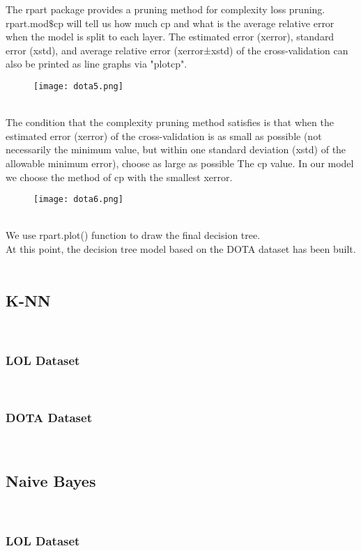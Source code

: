\documentclass[a4paper,fleqn]{cas-sc}
\begin{document}
The rpart package provides a pruning method for complexity loss pruning. rpart.mod$\$ $cp will tell us how much cp and what is the average relative error when the model is split to each layer.  The estimated error (xerror), standard error (xstd), and average relative error (xerror±xstd) of the cross-validation can also be printed as line graphs via "plotcp".\\
\begin{figure}[h!]
	\centering
		\texttt{[image: dota5.png]}
	\caption{}
	\label{FIG:1}
\end{figure}\\
The condition that the complexity pruning method satisfies is that when the estimated error (xerror) of the cross-validation is as small as possible (not necessarily the minimum value, but within one standard deviation (xstd) of the allowable minimum error), choose as large as possible The cp value. In our model we  choose the method of cp with the smallest xerror.\\
\begin{figure}[h!]
	\centering
		\texttt{[image: dota6.png]}
	\caption{}
	\label{FIG:1}
\end{figure}\\
We use rpart.plot() function to draw the final decision tree.\\
At this point, the decision tree model based on the DOTA dataset has been built.\\\\
\subsection{K-NN}
 \\
\subsubsection{LOL Dataset}
 \\
\subsubsection{DOTA Dataset}
 \\
\subsection{Naive Bayes}
 \\
\subsubsection{LOL Dataset}
 \\
\end{document}
